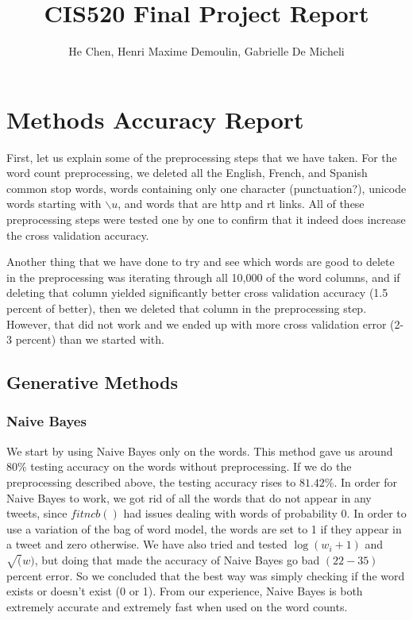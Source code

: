 \documentclass[11pt,twocolumn]{report}
\author{He Chen, Henri Maxime Demoulin, Gabrielle De Micheli}
\title{CIS520 Final Project Report}
\begin{document}
\maketitle
\section*{Methods Accuracy Report}
    First, let us explain some of the preprocessing steps that we have taken.
    For the word count preprocessing, we deleted all the English, French, and Spanish common stop words, words containing only one character (punctuation?), unicode words starting with $\backslash u$, and words that are http and rt links. All of these preprocessing steps were tested one by one to confirm that it indeed does increase the cross validation accuracy. 

	Another thing that we have done to try and see which words are good to delete in the preprocessing was iterating through all 10,000 of the word columns, and if deleting that column yielded significantly better cross validation accuracy (1.5 percent of better), then we deleted that column in the preprocessing step. However, that did not work and we ended up with more cross validation error (2-3 percent) than we started with.
    
    \subsection*{Generative Methods}
    \subsubsection{Naive Bayes}
    We start by using Naive Bayes only on the words. This method gave us around $80 \%$ testing accuracy on the words without preprocessing. If we do the preprocessing described above, the testing accuracy rises to $81.42\%$. In order for Naive Bayes to work, we got rid of all the words that do not appear in any tweets, since $fitncb()$ had issues dealing with words of probability $0$. In order to use a variation of the bag of word model, the words are set to 1 if they appear in a tweet and zero otherwise.
    We have also tried and tested $\log(w_i + 1)$ and $\sqrt(w)$, but doing that made the accuracy of Naive Bayes go bad $(22-35)$ percent error. So we concluded that the best way was simply checking if the word exists or doesn't exist (0 or 1). 
	From our experience, Naive Bayes is both extremely accurate and extremely fast when used on the word counts.   
   
\end{document}
